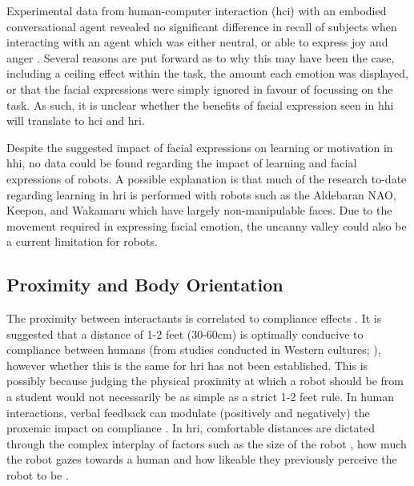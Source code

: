 Experimental data from human-computer interaction (\acrshort{hci}) with an embodied conversational agent revealed no significant difference in recall of subjects when interacting with an agent which was either neutral, or able to express joy and anger \citep{becker2013affective}. Several reasons are put forward as to why this may have been the case, including a ceiling effect within the task, the amount each emotion was displayed, or that the facial expressions were simply ignored in favour of focussing on the task. As such, it is unclear whether the benefits of facial expression seen in \acrshort{hhi} will translate to \acrshort{hci} and \acrshort{hri}.

Despite the suggested impact of facial expressions on learning or motivation in \acrshort{hhi}, no data could be found regarding the impact of learning and facial expressions of robots. A possible explanation is that much of the research to-date regarding learning in \acrshort{hri} is performed with robots such as the Aldebaran NAO, Keepon, and Wakamaru which have largely non-manipulable faces. Due to the movement required in expressing facial emotion, the uncanny valley \citep{mori2012uncanny} could also be a current limitation for robots.


\subsection{Proximity and Body Orientation} \label{sec:background-orientation}
The proximity between interactants is correlated to compliance effects \citep{peters2007gaining}. It is suggested that a distance of 1-2 feet (30-60cm) is optimally conducive to compliance between humans (from studies conducted in Western cultures; \citealp{segrin1993effects}), however whether this is the same for \acrshort{hri} has not been established. This is possibly because judging the physical proximity at which a robot should be from a student would not necessarily be as simple as a strict 1-2 feet rule. In human interactions, verbal feedback can modulate (positively and negatively) the proxemic impact on compliance \citep{greene1977effects}. In \acrshort{hri}, comfortable distances are dictated through the complex interplay of factors such as the size of the robot \citep{hiroi2011influence}, how much the robot gazes towards a human and how likeable they previously perceive the robot to be \citep{kim2014distance}.

